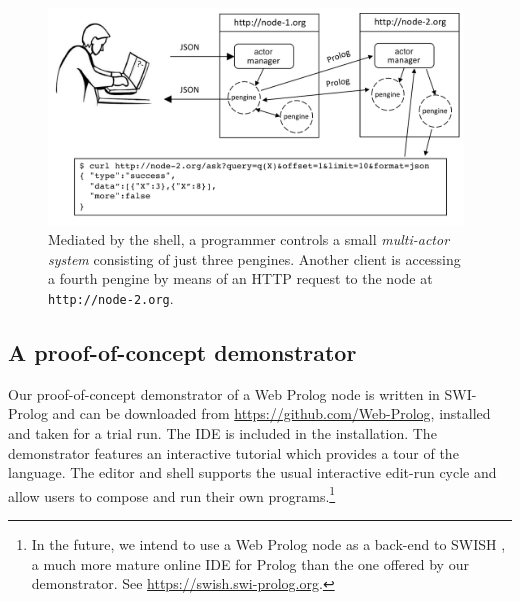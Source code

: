 \documentclass{tlp}
\begin{document}
\begin{figure}[h]
    \centering
	\includegraphics[width=11cm]{swish-pengine-interaction-2}
    \caption{Mediated by the shell, a programmer controls a small \textit{multi-actor system} consisting of just three pengines. Another client is accessing a fourth pengine by means of an HTTP request to the node at \texttt{http://node-2.org}.}
    \label{fig:swish-pengine-interaction-2}
\end{figure}


\subsection{A proof-of-concept demonstrator}

\noindent Our proof-of-concept demonstrator of a Web Prolog node is written in SWI-Prolog \cite{wielemaker:2011:tplp} and can be downloaded from \url{https://github.com/Web-Prolog}, installed and taken for a trial run. The IDE is included in the installation. The demonstrator features an interactive tutorial which provides a tour of the language. The editor and shell supports the usual interactive edit-run cycle and allow users to compose and run their own programs.\footnote{In the future, we intend to use a Web Prolog node as a back-end to SWISH \cite{DBLP:journals/corr/abs-1808-08042}, a much more mature online IDE for Prolog than the one offered by our demonstrator. See \url{https://swish.swi-prolog.org}.}


\end{document}

